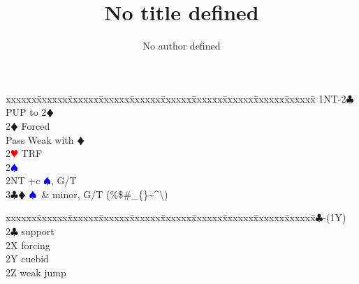 \documentclass[a4paper]{article}
\title{No title defined}
\author{No author defined}
\newcommand{\BC}{\textcolor{OliveGreen}{$\clubsuit$}}
\newcommand{\BD}{\textcolor{RedOrange}{$\vardiamondsuit$}}
\newcommand{\BH}{\textcolor{Red}{$\varheartsuit${}}}
\newcommand{\BS}{\textcolor{Blue}{$\spadesuit${}}}
\newenvironment{bidtable}
{\begin{tabbing}

xxxxxx\=xxxxxx\=xxxxxx\=xxxxxx\=xxxxxx\=xxxxxx\=xxxxxx\=xxxxxx\=xxxxxx\=xxxxxx\=\kill}
{\end{tabbing} }%
\begin{document}
\maketitle
\tableofcontents

\begin{bidtable}
1NT-2\BC \> PUP to 2\BD \+\\
2\BD \> Forced\+\\
Pass \> Weak with \BD \\
2\BH \> TRF\+\\
2\BS\+\\
2NT +c \BS , G/T\\
3\BC\BD \> \BS\ \& minor, G/T (\%\$\#\_\{\}\textasciitilde\textasciicircum\textbackslash)\-\-\-\-
\end{bidtable}
\bigbreak
\begin{bidtable}
1\BC-(1Y)\+\\
2\BC \> support\\
2X \> forcing\\
2Y \> cuebid\\
2Z \> weak jump\-
\end{bidtable}
\bigbreak
\end{document}
